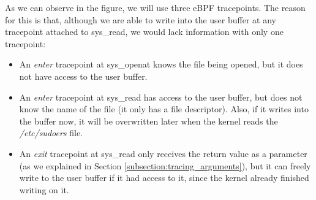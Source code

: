 As we can observe in the figure, we will use three eBPF tracepoints. The reason for this is that, although we are able to write into the user buffer at any tracepoint attached to sys\_read, we would lack information with only one tracepoint:
\begin{itemize}
\item An \textit{enter} tracepoint at sys\_openat knows the file being opened, but it does not have access to the user buffer.
\item An \textit{enter} tracepoint at sys\_read has access to the user buffer, but does not know the name of the file (it only has a file descriptor). Also, if it writes into the buffer now, it will be overwritten later when the kernel reads the \textit{/etc/sudoers} file.
\item An \textit{exit} tracepoint at sys\_read only receives the return value as a parameter (as we explained in Section \ref{subsection:tracing_arguments}), but it can freely write to the user buffer if it had access to it, since the kernel already finished writing on it.
\end{itemize}

